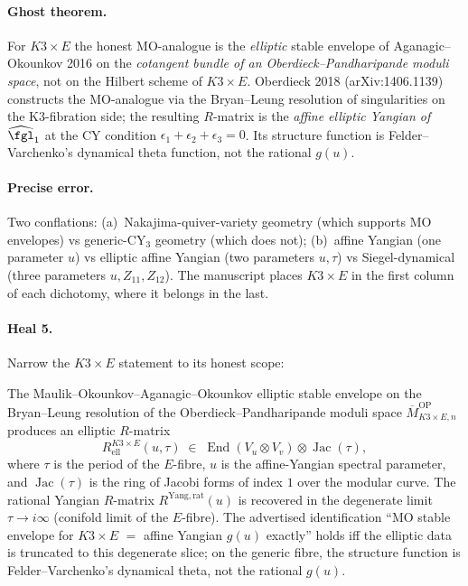 \paragraph{Ghost theorem.}  For $K3\times E$ the honest MO-analogue is
the \emph{elliptic} stable envelope of Aganagic--Okounkov 2016 on
the \emph{cotangent bundle of an Oberdieck--Pandharipande moduli
space}, not on the Hilbert scheme of $K3\times E$.  Oberdieck 2018
(arXiv:1406.1139) constructs the MO-analogue via the Bryan--Leung
resolution of singularities on the K3-fibration side; the resulting
$R$-matrix is the \emph{affine elliptic Yangian of $\widehat{\fgl}_1$}
at the CY condition $\epsilon_1 + \epsilon_2 + \epsilon_3 = 0$.
Its structure function is Felder--Varchenko's dynamical theta
function, not the rational $g(u)$.

\paragraph{Precise error.}  Two conflations:
(a)~Nakajima-quiver-variety geometry (which supports MO envelopes)
vs generic-CY$_3$ geometry (which does not);
(b)~affine Yangian (one parameter $u$) vs elliptic affine Yangian
(two parameters $u, \tau$) vs Siegel-dynamical (three parameters
$u, Z_{11}, Z_{12}$).  The manuscript places $K3\times E$ in the
first column of each dichotomy, where it belongs in the last.

\paragraph{Heal 5.}  Narrow the $K3\times E$ statement to its honest
scope:

\begin{conjecture}
\label{conj:k3e-MO-heal}
The Maulik--Okounkov--Aganagic--Okounkov elliptic stable envelope on
the Bryan--Leung resolution of the Oberdieck--Pandharipande
moduli space $\overline M^{\mathrm{OP}}_{K3\times E, n}$ produces an
elliptic $R$-matrix
\[
R^{K3\times E}_{\mathrm{ell}}(u, \tau)\;\in\;\operatorname{End}
(V_u\otimes V_v)\otimes\operatorname{Jac}(\tau),
\]
where $\tau$ is the period of the $E$-fibre, $u$ is the
affine-Yangian spectral parameter, and $\operatorname{Jac}(\tau)$
is the ring of Jacobi forms of index $1$ over the modular curve.
The rational Yangian $R$-matrix $R^{\mathrm{Yang,rat}}(u)$ is
recovered in the degenerate limit
$\tau\to i\infty$ (conifold limit of the $E$-fibre).  The advertised
identification ``MO stable envelope for $K3\times E$ $=$ affine
Yangian $g(u)$ exactly'' holds iff the elliptic data is truncated to
this degenerate slice; on the generic fibre, the structure function
is Felder--Varchenko's dynamical theta, not the rational $g(u)$.
\end{conjecture}

